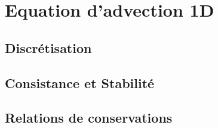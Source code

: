 \section{Equation d'advection 1D}

\subsection{Discrétisation}

\subsection{Consistance et Stabilité}

\subsection{Relations de conservations}